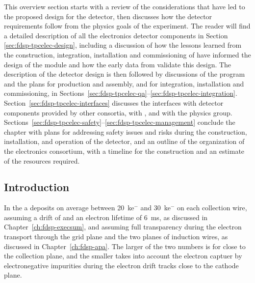 This overview section starts with a review of the considerations that
have led to the proposed design for the   detector, 
then discusses how the detector requirements follow from the physics goals 
of the experiment. The reader will find a detailed description of all the 
 electronics detector components in Section \ref{sec:fdsp-tpcelec-design},
including a discussion of how the lessons learned from the construction,
integration, installation and commissioning of  have informed
the design of the   module and how the early data
from  validate this design. The description of the detector
design is then followed by discussions 
of the  program and the plans for production and assembly, 
and for integration, installation and commissioning, in 
Sections~\ref{sec:fdsp-tpcelec-qa}--\ref{sec:fdsp-tpcelec-integration}. 
Section~\ref{sec:fdsp-tpcelec-interfaces} discusses the interfaces with 
detector components provided by other consortia, with , and with the physics group. 
Sections~\ref{sec:fdsp-tpcelec-safety}--\ref{sec:fdsp-tpcelec-management} 
conclude the chapter with plans for addressing safety issues and risks during the
construction, installation, and operation of the detector, and 
an outline of the organization of the  electronics consortium, 
with a timeline for the  construction and an estimate
of the resources required.

\subsection{Introduction}
\label{sec:fdsp-tpcelec-overview-intro}

In the   a  deposits on average between
\SI{20}{k}{e$^-$} and \SI{30}{k}{e$^-$} on each collection wire, assuming a drift \efield
of \spmaxfield and an electron lifetime of \SI{6}{ms}, as discussed in
Chapter~\ref{ch:fdsp-execsum}, and assuming full transparency during the 
electron transport through the grid plane and the two planes of induction
wires, as discussed in Chapter~\ref{ch:fdsp-apa}. The larger of the two numbers 
is for  close to the collection plane, and the smaller
takes into account the electron captuer by electronegative impurities during the electron
drift tracks close to the cathode plane. 

